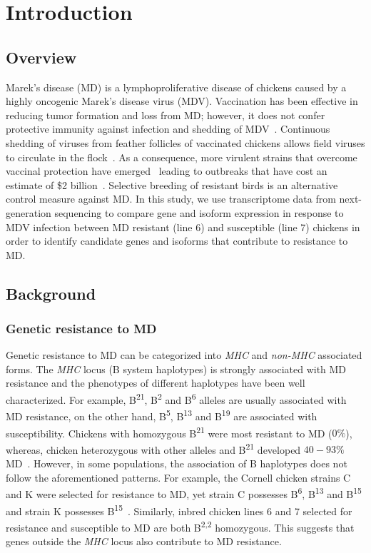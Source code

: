 \chapter{Introduction}
\section{Overview}

Marek's disease (MD) is a lymphoproliferative disease of chickens
caused by a highly oncogenic Marek's disease virus (MDV).
Vaccination has been effective in reducing tumor formation and
loss from MD; however, it does not confer protective immunity
against infection and shedding of MDV~\cite{gimeno2008marek}.
Continuous shedding of viruses from feather follicles of
vaccinated chickens allows field viruses to circulate in the
flock~\cite{morrow2004marek}.  As a consequence, more virulent
strains that overcome vaccinal protection have
emerged~\cite{witter1998control,gimeno2008marek} leading to
outbreaks that have cost an estimate of \$2
billion~\cite{morrow2004marek}.  Selective breeding of resistant
birds is an alternative control measure against MD.  In this
study, we use transcriptome data from next-generation sequencing
to compare gene and isoform expression in response to MDV
infection between MD resistant (line 6) and susceptible (line 7)
chickens in order to identify candidate genes and isoforms that
contribute to resistance to MD.

\section{Background}
\subsection{Genetic resistance to MD}

Genetic resistance to MD can be categorized into {\em MHC}
and {\em non-MHC} associated forms.  The {\em MHC} locus (B
system haplotypes) is strongly associated with MD resistance
and the phenotypes of different haplotypes have been well
characterized.  For example, B\textsuperscript{21},
B\textsuperscript{2} and B\textsuperscript{6} alleles are
usually associated with MD resistance, on the other hand,
B\textsuperscript{5}, B\textsuperscript{13} and
B\textsuperscript{19} are associated with susceptibility.
Chickens with homozygous B\textsuperscript{21} were most
resistant to MD ($0\%$), whereas, chicken heterozygous with
other alleles and B\textsuperscript{21} developed $40-93\%$
MD~\cite{briles1980identification}.  However, in some
populations, the association of B haplotypes does not follow
the aforementioned patterns. For example, the Cornell
chicken strains C and K were selected for resistance to MD,
yet strain C possesses B\textsuperscript{6},
B\textsuperscript{13} and B\textsuperscript{15} and strain K
possesses
B\textsuperscript{15}~\cite{bacon1987influence,briles1980identification}.
Similarly, inbred chicken lines 6 and 7 selected for
resistance and susceptible to MD are both
B\textsuperscript{2,2} homozygous.  This suggests that genes
outside the {\em MHC} locus also contribute to MD
resistance.

